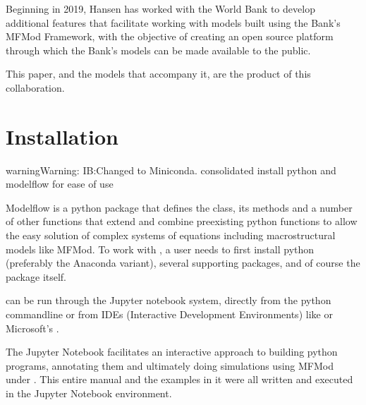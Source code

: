 \documentclass[letterpaper,10pt,english]{jupyterBook}
\begin{document}
\sphinxAtStartPar
Beginning in 2019, Hansen has worked with the World Bank to develop additional features that facilitate working with models built using the Bank’s MFMod Framework, with the objective of creating an open source platform through which the Bank’s models can be made available to the public.

\sphinxAtStartPar
This paper, and the models that accompany it, are the product of this collaboration.

\sphinxstepscope


\chapter{Installation}
\label{\detokenize{content/03_Installation/Installing:installation}}\label{\detokenize{content/03_Installation/Installing::doc}}
\begin{sphinxadmonition}{warning}{Warning:}
\sphinxAtStartPar
IB:Changed to Miniconda.
consolidated  install python and modelflow for ease of use
\end{sphinxadmonition}

\sphinxAtStartPar
Modelflow is a python package that defines the  class, its methods and a number of other functions that extend and combine pre\sphinxhyphen{}existing python functions to allow the easy solution of complex systems of equations including macro\sphinxhyphen{}structural models like MFMod.  To work with , a user needs to first install python (preferably the Anaconda variant), several supporting packages, and of course the  package itself.

\sphinxAtStartPar
{} can be run through the Jupyter notebook system, directly from the python command\sphinxhyphen{}line or from IDEs (Interactive Development Environments) like  or Microsoft’s .

\sphinxAtStartPar
The Jupyter Notebook facilitates an interactive approach to building python programs, annotating them and ultimately doing simulations using MFMod under . This entire manual and the examples in it were all written and executed in the Jupyter Notebook environment.
\end{document}

